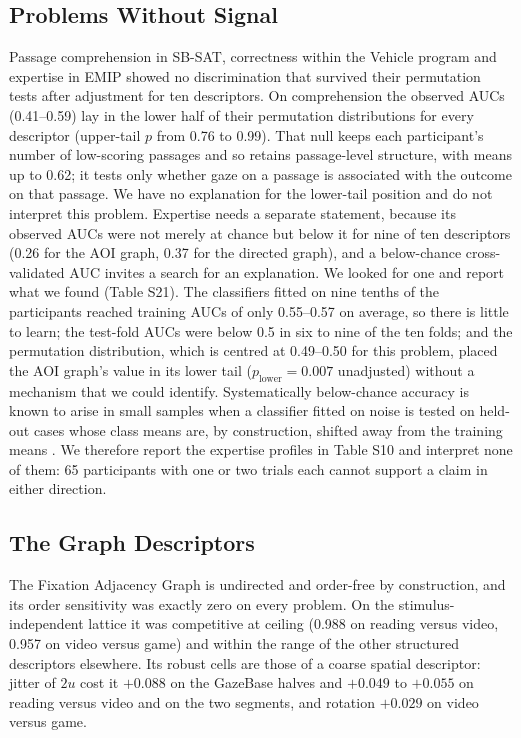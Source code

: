 \subsection{Problems Without Signal}\label{sec:nosignal}
Passage comprehension in SB-SAT, correctness within the Vehicle program and expertise in EMIP showed no discrimination that survived their permutation tests after adjustment for ten descriptors. On comprehension the observed AUCs (0.41--0.59) lay in the lower half of their permutation distributions for every descriptor (upper-tail $p$ from 0.76 to 0.99). That null keeps each participant's number of low-scoring passages and so retains passage-level structure, with means up to 0.62; it tests only whether gaze on a passage is associated with the outcome on that passage. We have no explanation for the lower-tail position and do not interpret this problem. Expertise needs a separate statement, because its observed AUCs were not merely at chance but below it for nine of ten descriptors (0.26 for the AOI graph, 0.37 for the directed graph), and a below-chance cross-validated AUC invites a search for an explanation. We looked for one and report what we found (Table S21). The classifiers fitted on nine tenths of the participants reached training AUCs of only 0.55--0.57 on average, so there is little to learn; the test-fold AUCs were below 0.5 in six to nine of the ten folds; and the permutation distribution, which is centred at 0.49--0.50 for this problem, placed the AOI graph's value in its lower tail ($p_{\mathrm{lower}} = 0.007$ unadjusted) without a mechanism that we could identify. Systematically below-chance accuracy is known to arise in small samples when a classifier fitted on noise is tested on held-out cases whose class means are, by construction, shifted away from the training means \citep{jamalabadi2016classification}. We therefore report the expertise profiles in Table S10 and interpret none of them: 65 participants with one or two trials each cannot support a claim in either direction.

\subsection{The Graph Descriptors}\label{sec:graph}
The Fixation Adjacency Graph is undirected and order-free by construction, and its order sensitivity was exactly zero on every problem. On the stimulus-independent lattice it was competitive at ceiling (0.988 on reading versus video, 0.957 on video versus game) and within the range of the other structured descriptors elsewhere. Its robust cells are those of a coarse spatial descriptor: jitter of $2u$ cost it $+0.088$ on the GazeBase halves and $+0.049$ to $+0.055$ on reading versus video and on the two segments, and rotation $+0.029$ on video versus game.

